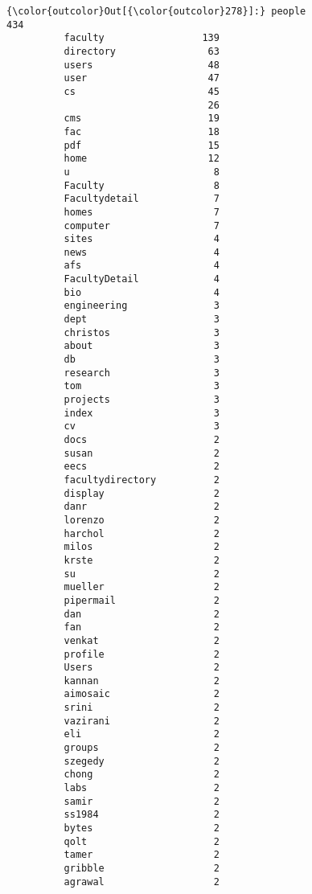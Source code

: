 \documentclass[11pt]{article}
\begin{document}
            \begin{Verbatim}[commandchars=\\\{\}]
{\color{outcolor}Out[{\color{outcolor}278}]:} people                  434
          faculty                 139
          directory                63
          users                    48
          user                     47
          cs                       45
                                   26
          cms                      19
          fac                      18
          pdf                      15
          home                     12
          u                         8
          Faculty                   8
          Facultydetail             7
          homes                     7
          computer                  7
          sites                     4
          news                      4
          afs                       4
          FacultyDetail             4
          bio                       4
          engineering               3
          dept                      3
          christos                  3
          about                     3
          db                        3
          research                  3
          tom                       3
          projects                  3
          index                     3
          cv                        3
          docs                      2
          susan                     2
          eecs                      2
          facultydirectory          2
          display                   2
          danr                      2
          lorenzo                   2
          harchol                   2
          milos                     2
          krste                     2
          su                        2
          mueller                   2
          pipermail                 2
          dan                       2
          fan                       2
          venkat                    2
          profile                   2
          Users                     2
          kannan                    2
          aimosaic                  2
          srini                     2
          vazirani                  2
          eli                       2
          groups                    2
          szegedy                   2
          chong                     2
          labs                      2
          samir                     2
          ss1984                    2
          bytes                     2
          qolt                      2
          tamer                     2
          gribble                   2
          agrawal                   2

\end{Verbatim}
\end{document}
